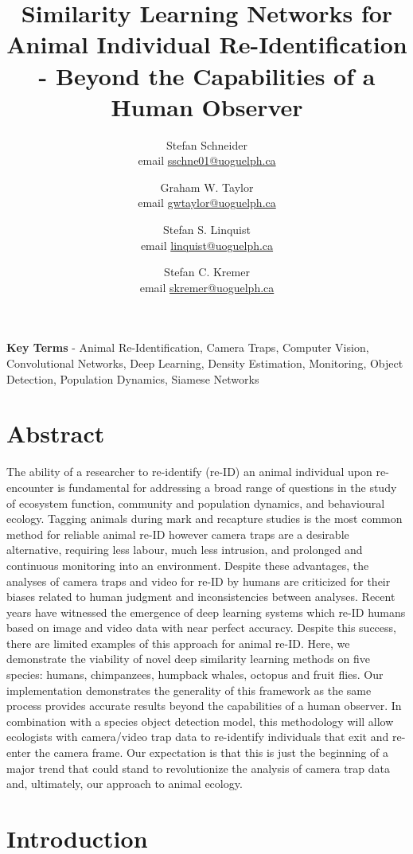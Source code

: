 \documentclass[11pt]{article}
\title{Similarity Learning Networks for Animal Individual Re-Identification - Beyond the Capabilities of a Human Observer}
\author{Stefan Schneider \\ email \href{mailto:sschne01@uoguelph.ca}{sschne01@uoguelph.ca} 
   \and Graham W. Taylor \\ email \href{mailto:gwtaylor@uoguelph.ca}{gwtaylor@uoguelph.ca} 
   \and Stefan S. Linquist \\ email \href{mailto:linquist@uoguelph.ca}{linquist@uoguelph.ca} 
   \and Stefan C. Kremer \\ email \href{mailto:skremer@uoguelph.ca}{skremer@uoguelph.ca} }
\begin{document}
\maketitle

\textbf{Key Terms} - Animal Re-Identification, Camera Traps, Computer Vision, Convolutional Networks, Deep Learning, Density Estimation, Monitoring, Object Detection, Population Dynamics, Siamese Networks
\\
\newpage

\section*{Abstract}
The ability of a researcher to re-identify (re-ID) an animal individual upon re-encounter is fundamental for addressing a broad range of questions in the study of ecosystem function, community and population dynamics, and behavioural ecology. Tagging animals during mark and recapture studies is the most common method for reliable animal re-ID however camera traps are a desirable alternative, requiring less labour, much less intrusion, and prolonged and continuous monitoring into an environment. Despite these advantages, the analyses of camera traps and video for re-ID by humans are criticized for their biases related to human judgment and inconsistencies between analyses. Recent years have witnessed the emergence of deep learning systems which re-ID humans based on image and video data with near perfect accuracy. Despite this success, there are limited examples of this approach for animal re-ID. Here, we demonstrate the viability of novel deep similarity learning methods on five species: humans, chimpanzees, humpback whales, octopus and fruit flies. Our implementation demonstrates the generality of this framework as the same process provides accurate results beyond the capabilities of a human observer. In combination with a species object detection model, this methodology will allow ecologists with camera/video trap data to re-identify individuals that exit and re-enter the camera frame. Our expectation is that this is just the beginning of a major trend that could stand to revolutionize the analysis of camera trap data and, ultimately, our approach to animal ecology.
\newpage

\section*{Introduction}
\end{document}
